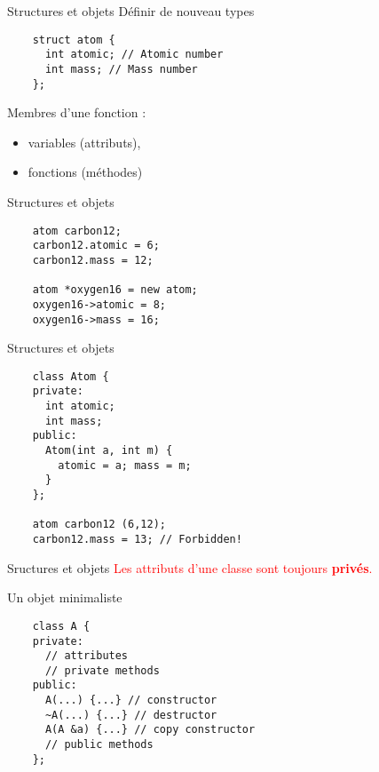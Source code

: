 
\begin{frame}[fragile]{Structures et objets}
  Définir de nouveau types
  \begin{lstlisting}
    struct atom {
      int atomic; // Atomic number
      int mass; // Mass number
    };
  \end{lstlisting}

  Membres d'une fonction :
  \begin{itemize}
  \item variables (attributs),
  \item fonctions (méthodes)
  \end{itemize}
\end{frame}

\begin{frame}[fragile]{Structures et objets}
  \begin{lstlisting}
    atom carbon12;
    carbon12.atomic = 6;
    carbon12.mass = 12;

    atom *oxygen16 = new atom;
    oxygen16->atomic = 8;
    oxygen16->mass = 16;
  \end{lstlisting}
\end{frame}

\begin{frame}[fragile]{Structures et objets}
  \begin{lstlisting}
    class Atom {
    private:
      int atomic;
      int mass;
    public:
      Atom(int a, int m) {
        atomic = a; mass = m;
      }
    };

    atom carbon12 (6,12);
    carbon12.mass = 13; // Forbidden!
  \end{lstlisting}
\end{frame}

\begin{frame}{Sructures et objets}
  \textcolor{red}{Les attributs d'une classe sont toujours \textbf{privés}.}
\end{frame}

\begin{frame}[fragile]{Un objet minimaliste}
  \begin{lstlisting}
    class A {
    private:
      // attributes
      // private methods
    public:
      A(...) {...} // constructor
      ~A(...) {...} // destructor
      A(A &a) {...} // copy constructor
      // public methods
    };
  \end{lstlisting}
\end{frame}

